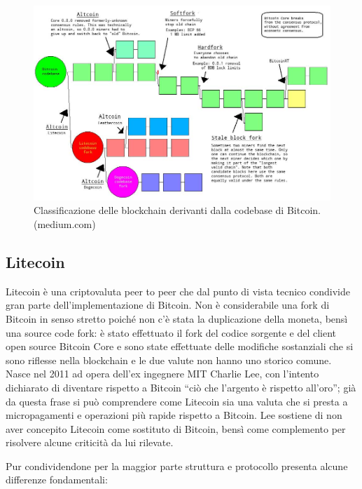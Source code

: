 \begin{figure}
	\centering
	\includegraphics[width=1.0\linewidth]{images/altcoinsoftforksetc}
	\caption{Classificazione delle blockchain derivanti dalla codebase di Bitcoin. (medium.com)}
	\label{fig:altcoinsoftforksetc}
\end{figure}





\subsection{Litecoin}
Litecoin è una criptovaluta peer to peer che dal punto di vista tecnico condivide gran parte dell’implementazione di Bitcoin. Non è considerabile una fork di Bitcoin in senso stretto poiché non c’è stata la duplicazione della moneta, bensì una source code fork: è stato effettuato il fork del codice sorgente e del client open source Bitcoin Core e sono state effettuate delle modifiche sostanziali che si sono riflesse nella blockchain e le due valute non hanno uno storico comune. 
Nasce nel 2011 ad opera dell’ex ingegnere MIT Charlie Lee, con l’intento dichiarato di diventare rispetto a Bitcoin “ciò che l’argento è rispetto all’oro”; già da questa frase si può comprendere come Litecoin sia una valuta che si presta a micropagamenti e operazioni più rapide rispetto a Bitcoin. Lee sostiene di non aver concepito Litecoin come sostituto di Bitcoin, bensì come complemento per risolvere alcune criticità da lui rilevate.

Pur condividendone per la maggior parte struttura e protocollo presenta alcune differenze fondamentali:

